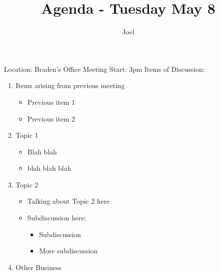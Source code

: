 \documentclass{article}
\begin{document}
  \author{Joel}
  \title{Agenda - Tuesday May 8}
  \maketitle \begin{flushleft}
Location: Braden's Office 
\newline
Meeting Start: 3pm 
\newline
Items of Discussion:

\begin{enumerate}

  \item Items arising from previous meeting 
    \begin{itemize}
    \item Previous item 1
    \item Previous item 2
  \end{itemize}

  \item Topic 1
    \begin{itemize}
    \item Blah blah
    \item blah blah blah
  \end{itemize}

  \item Topic 2
    \begin{itemize}
	  \item Talking about Topic 2 here
	  \item Subdiscussion here:
	    \begin{itemize}
		  \item Subdiscussion
		  \item More subdiscussion
	    \end{itemize}
  \end{itemize}
  
  \item Other Business

\end{enumerate}
\end{flushleft}
\end{document}
